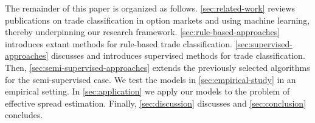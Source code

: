The remainder of this paper is organized as follows. \cref{sec:related-work} reviews publications on trade classification in option markets and using machine learning, thereby underpinning our research framework. \cref{sec:rule-based-approaches} introduces extant methods for rule-based trade classification. \cref{sec:supervised-approaches} discusses and introduces supervised methods for trade classification. Then, \cref{sec:semi-supervised-approaches} extends the previously selected algorithms for the semi-supervised case. We test the models in \cref{sec:empirical-study} in an empirical setting. In \cref{sec:application} we apply our models to the problem of effective spread estimation. Finally, \cref{sec:discussion} discusses and \cref{sec:conclusion} concludes.
